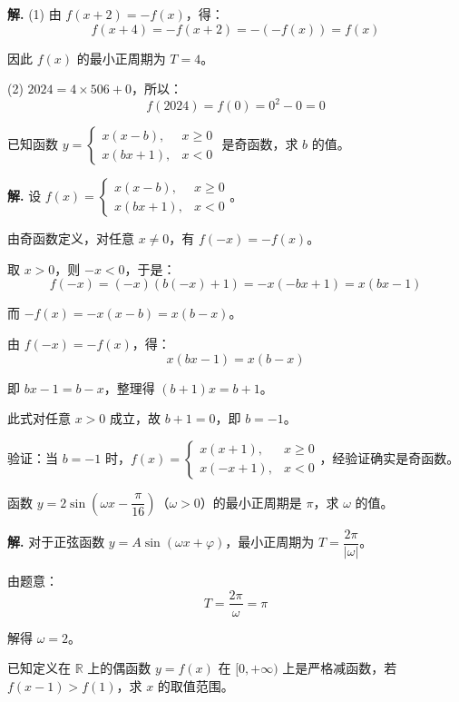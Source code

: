 \documentclass[11pt]{ctexrep}
\begin{document}
\textbf{解.} (1) 由 $f(x+2) = -f(x)$，得：
\[
    f(x+4) = -f(x+2) = -(-f(x)) = f(x)
\]

因此 $f(x)$ 的最小正周期为 $T = 4$。

(2) $2024 = 4 \times 506 + 0$，所以：
\[
    f(2024) = f(0) = 0^2 - 0 = 0
\]

\begin{realexam}[2026 上海奉贤二模]
    已知函数 $y = \begin{cases} x(x-b), & x \geq 0 \\ x(bx+1), & x < 0 \end{cases}$ 是奇函数，求 $b$ 的值。
\end{realexam}

\textbf{解.} 设 $f(x) = \begin{cases} x(x-b), & x \geq 0 \\ x(bx+1), & x < 0 \end{cases}$。

由奇函数定义，对任意 $x \neq 0$，有 $f(-x) = -f(x)$。

取 $x > 0$，则 $-x < 0$，于是：
\[
    f(-x) = (-x)(b(-x)+1) = -x(-bx+1) = x(bx-1)
\]

而 $-f(x) = -x(x-b) = x(b-x)$。

由 $f(-x) = -f(x)$，得：
\[
    x(bx-1) = x(b-x)
\]

即 $bx - 1 = b - x$，整理得 $(b+1)x = b+1$。

此式对任意 $x > 0$ 成立，故 $b+1 = 0$，即 $b = -1$。

验证：当 $b = -1$ 时，$f(x) = \begin{cases} x(x+1), & x \geq 0 \\ x(-x+1), & x < 0 \end{cases}$，经验证确实是奇函数。

\begin{realexam}[2025 上海高三二模]
    函数 $y = 2\sin\left(\omega x - \dfrac{\pi}{16}\right)$（$\omega > 0$）的最小正周期是 $\pi$，求 $\omega$ 的值。
\end{realexam}

\textbf{解.} 对于正弦函数 $y = A\sin(\omega x + \varphi)$，最小正周期为 $T = \dfrac{2\pi}{|\omega|}$。

由题意：
\[
    T = \frac{2\pi}{\omega} = \pi
\]

解得 $\omega = 2$。

\begin{realexam}[2026 上海闵行二模]
    已知定义在 $\mathbb{R}$ 上的偶函数 $y = f(x)$ 在 $[0, +\infty)$ 上是严格减函数，若 $f(x-1) > f(1)$，求 $x$ 的取值范围。
\end{realexam}
\end{document}
